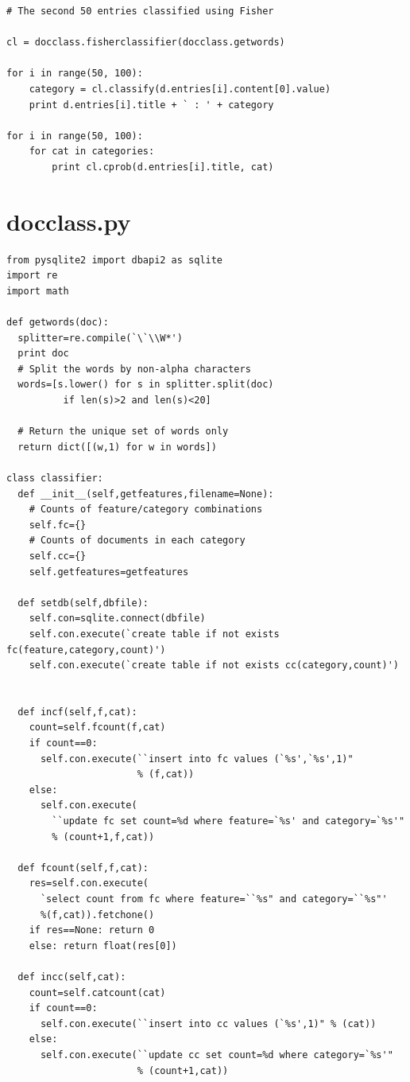 \documentclass{article}
\begin{document}
\begin{lstlisting}[frame=single, caption=createTrainingData.py, label=createtrainingdata]
# The second 50 entries classified using Fisher

cl = docclass.fisherclassifier(docclass.getwords)

for i in range(50, 100):
	category = cl.classify(d.entries[i].content[0].value)
	print d.entries[i].title + ` : ' + category
	
for i in range(50, 100):
	for cat in categories:
		print cl.cprob(d.entries[i].title, cat)

\end{lstlisting}

\section{docclass.py}

\begin{lstlisting}[frame=single, caption=docclass.py, label=docclass]
from pysqlite2 import dbapi2 as sqlite
import re
import math

def getwords(doc):
  splitter=re.compile(`\`\\W*')
  print doc
  # Split the words by non-alpha characters
  words=[s.lower() for s in splitter.split(doc) 
          if len(s)>2 and len(s)<20]
  
  # Return the unique set of words only
  return dict([(w,1) for w in words])

class classifier:
  def __init__(self,getfeatures,filename=None):
    # Counts of feature/category combinations
    self.fc={}
    # Counts of documents in each category
    self.cc={}
    self.getfeatures=getfeatures
    
  def setdb(self,dbfile):
    self.con=sqlite.connect(dbfile)    
    self.con.execute(`create table if not exists fc(feature,category,count)')
    self.con.execute(`create table if not exists cc(category,count)')


  def incf(self,f,cat):
    count=self.fcount(f,cat)
    if count==0:
      self.con.execute(``insert into fc values (`%s',`%s',1)" 
                       % (f,cat))
    else:
      self.con.execute(
        ``update fc set count=%d where feature=`%s' and category=`%s'" 
        % (count+1,f,cat)) 
  
  def fcount(self,f,cat):
    res=self.con.execute(
      `select count from fc where feature=``%s" and category=``%s"'
      %(f,cat)).fetchone()
    if res==None: return 0
    else: return float(res[0])

  def incc(self,cat):
    count=self.catcount(cat)
    if count==0:
      self.con.execute(``insert into cc values (`%s',1)" % (cat))
    else:
      self.con.execute(``update cc set count=%d where category=`%s'" 
                       % (count+1,cat))    


\end{lstlisting}
\end{document}

